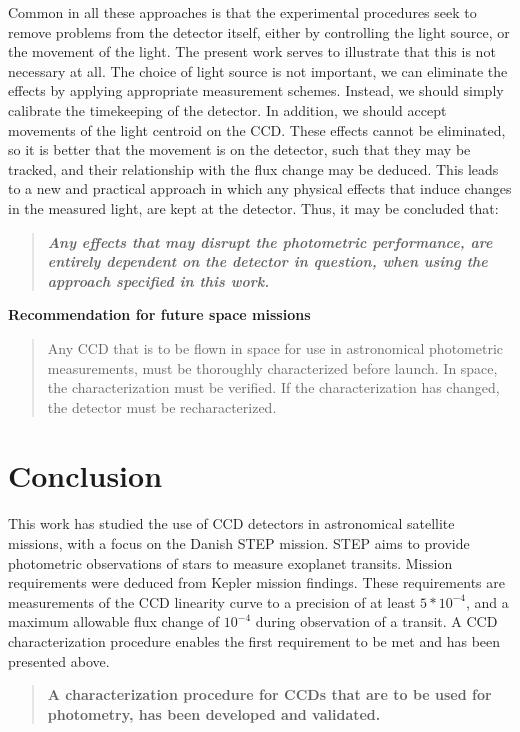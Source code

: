 \documentclass[../main.tex]{subfiles}
\begin{document}
Common in all these approaches is that the experimental procedures seek to remove problems from the detector itself, either by controlling the light source, or the movement of the light. The present work serves to illustrate that this is not necessary at all. The choice of light source is not important, we can eliminate the effects by applying appropriate measurement schemes. Instead, we should simply calibrate the timekeeping of the detector. In addition, we should accept movements of the light centroid on the CCD. These effects cannot be eliminated, so it is better that the movement is on the detector, such that they may be tracked, and their relationship with the flux change may be deduced. This leads to a new and practical approach in which any physical effects that induce changes in the measured light, are kept at the detector. Thus, it may be concluded that:
\begin{quote}
	\textbf{\textit{Any effects that may disrupt the photometric performance, are entirely dependent on the detector in question, when using the approach specified in this work.}}
\end{quote}

\begin{tcolorbox}[colframe = white, sharpish corners]
	\textbf{Recommendation for future space missions}
	\begin{quote}
		Any CCD that is to be flown in space for use in astronomical photometric measurements, must be thoroughly characterized before launch. In space, the characterization must be verified. If the characterization has changed, the detector must be recharacterized.
	\end{quote}
\end{tcolorbox}

\section{Conclusion}
This work has studied the use of CCD detectors in astronomical satellite missions, with a focus on the Danish STEP mission. STEP aims to provide photometric observations of stars to measure exoplanet transits. Mission requirements were deduced from Kepler mission findings. These requirements are measurements of the CCD linearity curve to a precision of at least $5*10^{-4}$, and a maximum allowable flux change of $10^{-4}$ during observation of a transit. A CCD characterization procedure enables the first requirement to be met and has been presented above.

\begin{tcolorbox}[colframe = white, sharpish corners]
	\begin{quote}
		\textbf{A characterization procedure for CCDs that are to be used for photometry, has been developed and validated.}
	\end{quote}
\end{tcolorbox}
\end{document}
